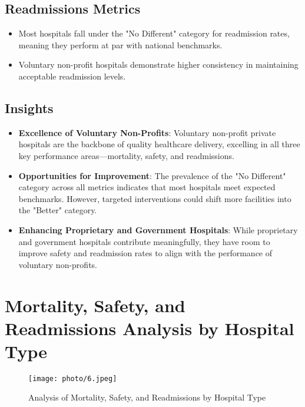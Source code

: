 \subsection{Readmissions Metrics}
\begin{itemize}
    \item Most hospitals fall under the "No Different" category for readmission rates, meaning they perform at par with national benchmarks.
    \item Voluntary non-profit hospitals demonstrate higher consistency in maintaining acceptable readmission levels.
\end{itemize}

\subsection{Insights}
\begin{itemize}
    \item \textbf{Excellence of Voluntary Non-Profits}: Voluntary non-profit private hospitals are the backbone of quality healthcare delivery, excelling in all three key performance areas—mortality, safety, and readmissions.
    \item \textbf{Opportunities for Improvement}: The prevalence of the "No Different" category across all metrics indicates that most hospitals meet expected benchmarks. However, targeted interventions could shift more facilities into the "Better" category.
    \item \textbf{Enhancing Proprietary and Government Hospitals}: While proprietary and government hospitals contribute meaningfully, they have room to improve safety and readmission rates to align with the performance of voluntary non-profits.
\end{itemize}



\section{Mortality, Safety, and Readmissions Analysis by Hospital Type}

\begin{figure}[ht]
    \centering
    \texttt{[image: photo/6.jpeg]} %
    \caption{Analysis of Mortality, Safety, and Readmissions by Hospital Type}
    \label{fig:metrics_by_hospital_type}
\end{figure}

